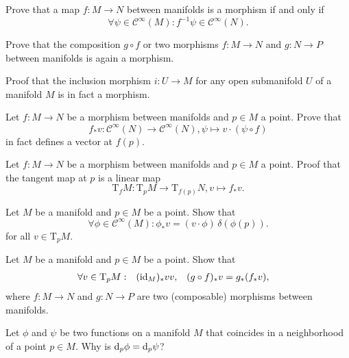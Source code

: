 \begin{xca}
  Prove that a map $f\colon M \to N$ between manifolds is a morphism if and only if
  \[
    \forall \psi \in \mathcal C^\infty(M):
    f^{-1} \psi \in \mathcal C^\infty(N).
  \]
\end{xca}

\begin{xca}
  Prove that the composition $g \circ f$ or two morphisms $f\colon M \to N$
  and $g\colon N \to P$ between manifolds is again a morphism.
\end{xca}

\begin{xca}
  Proof that the inclusion morphism $i\colon U \to M$ for any open submanifold
  $U$ of a manifold $M$ is in fact a morphism.
\end{xca}

\begin{xca}
  Let $f\colon M \to N$ be a morphism between manifolds and $p \in M$ a point.
  Prove that
  \[
    f_* v\colon \mathcal C^\infty(N) \to \mathcal C^\infty(N),
    \psi \mapsto v \cdot (\psi \circ f)
  \]
  in fact defines a vector at $f(p)$.
\end{xca}

\begin{xca}
  Let $f\colon M \to N$ be a morphism between manifolds and $p \in M$ a point.
  Proof that the tangent map at $p$ is a linear map
  \[
    \mathrm T_f M\colon \mathrm T_p M \to \mathrm T_{f(p)} N, v \mapsto f_* v.
  \]  
\end{xca}

\begin{xca}
  Let $M$ be a manifold and $p \in M$ be a point. Show that
  \[
    \forall \phi \in \mathcal C^\infty(M):
    \phi_* v = (v \cdot \phi) \, \delta(\phi(p)).
  \]
  for all $v \in \mathrm T_p M$.
\end{xca}

\begin{xca}
  Let $M$ be a manifold and $p \in M$ be a point. Show that
  \[
    \begin{aligned}
      \forall v \in \mathrm T_p M: &&
      (\mathrm{id}_M)_* v & v, &
      (g \circ f)_* v & = g_* (f_* v),
    \end{aligned}
  \]
  where $f\colon M \to N$ and $g\colon N \to P$ are two (composable) morphisms
  between manifolds.
\end{xca}

\begin{xca}
  Let $\phi$ and $\psi$ be two functions on a manifold $M$
  that coincides in a neighborhood of a point $p \in M$. Why is
  $\mathrm d_p \phi = \mathrm d_p \psi$?  
\end{xca}

